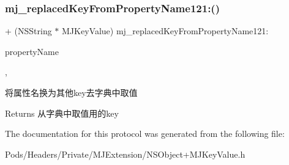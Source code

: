 \subsubsection{\texorpdfstring{mj\+\_\+replaced\+Key\+From\+Property\+Name121\+:()}{mj\_replacedKeyFromPropertyName121:()}\hspace{0.1cm}{\footnotesize\ttfamily [3/3]}}
{\footnotesize\ttfamily + (N\+S\+String $\ast$ M\+J\+Key\+Value) mj\+\_\+replaced\+Key\+From\+Property\+Name121\+: \begin{DoxyParamCaption}\item[{(N\+S\+String $\ast$)}]{property\+Name }\end{DoxyParamCaption}\hspace{0.3cm}{\ttfamily [static]}, {\ttfamily [optional]}}

将属性名换为其他key去字典中取值

\begin{DoxyReturn}{Returns}
从字典中取值用的key 
\end{DoxyReturn}


The documentation for this protocol was generated from the following file\+:\begin{DoxyCompactItemize}
\item 
Pods/\+Headers/\+Private/\+M\+J\+Extension/N\+S\+Object+\+M\+J\+Key\+Value.\+h\end{DoxyCompactItemize}

